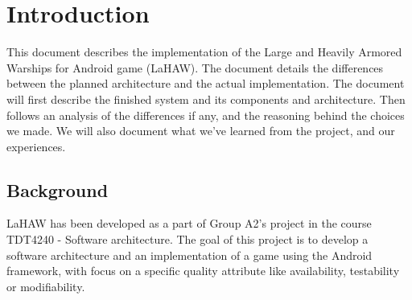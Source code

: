\chapter{Introduction}

This document describes the implementation of the Large and Heavily Armored Warships for Android game (LaHAW). The document details the differences between the planned architecture and the actual implementation. The document will first describe the finished system and its components and architecture. Then follows an analysis of the differences if any, and the reasoning behind the choices we made. We will also document what we've learned from the project, and our experiences.

\section{Background}
LaHAW has been developed as a part of Group A2's project in the course TDT4240 - Software architecture. The goal of this project is to develop a software architecture and an implementation of a game using the Android framework, with focus on a specific quality attribute like availability, testability or modifiability.